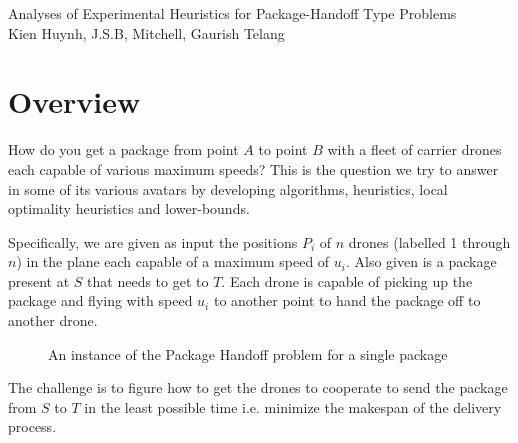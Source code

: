 \documentclass[10.0pt]{report}
\begin{document}
\begin{titlepage}
	\centering
        {\Huge Analyses of Experimental Heuristics for Package-Handoff Type Problems\\}
        \vspace{20mm}
        {\Large Kien Huynh, J.S.B, Mitchell, Gaurish Telang}
\end{titlepage}
\setcounter{page}{2} 
\setcounter{tocdepth}{1}
\tableofcontents
{}

\chapter{Overview}

How do you get a package from point $A$ to point $B$ with a fleet of carrier drones each 
capable of various maximum speeds? This is the question we try to answer in some of  
its various avatars by developing algorithms, heuristics, local optimality heuristics 
and lower-bounds. 

Specifically, we are given as input the positions $P_i$ of $n$ drones (labelled 1 through $n$) 
in the plane each capable of a maximum speed of $u_i$. Also given is a package present 
at $S$ that needs to get to $T$. Each drone is capable of picking up the package and 
flying with speed $u_i$ to another point to hand the package off to another drone. 

\begin{figure}[H]
    \centering
    \qquad
    \caption{An instance of the Package Handoff problem for a single package}%
    \label{single-pho-example}%
\end{figure}


The challenge is to figure how to get the drones to cooperate to send 
the package from $S$ to $T$ in the least possible time i.e. minimize the makespan
of the delivery process. 
\end{document}
